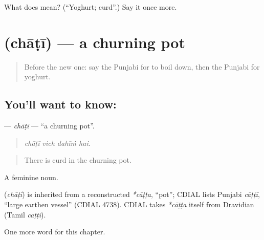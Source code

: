 \begin{tcolorbox}[breakable,colback=teal!4,colframe=teal!35!black,title={Before you move on}]
What does  mean? (\textquotedblleft{}Yoghurt; curd\textquotedblright{}.) Say it once more.
\end{tcolorbox}
\section[\texorpdfstring{\pa{ਚਾਟੀ} (chāṭī)}{ਚਾਟੀ (chāṭī)}]{ (chāṭī) — a churning pot}

\label{lesson:PA-C237-chati}



\begin{quote}
Before the new one: say the Punjabi for to boil down, then the Punjabi for yoghurt.
\end{quote}

\subsection*{You'll want to know: }
\textbf{} — \emph{chāṭī} — \textquotedblleft{}a churning pot\textquotedblright{}.

\begin{quote}
   
\end{quote}

\begin{quote}
\emph{chāṭī vich dahīṁ hai.}
\end{quote}

\begin{quote}
There is curd in the churning pot.
\end{quote}

A feminine noun.

\begin{cousinweb}
\textbf{} (\emph{chāṭī}) is inherited from a reconstructed \emph{*cāṭṭa}, \textquotedblleft{}pot\textquotedblright{}; CDIAL lists Punjabi \emph{cāṭṭī}, \textquotedblleft{}large earthen vessel\textquotedblright{} (CDIAL 4738). CDIAL takes \emph{*cāṭṭa} itself from Dravidian (Tamil \emph{caṭṭi}).
\end{cousinweb}

\begin{grammarlens}[title={What you've built}]
One more word for this chapter.
\end{grammarlens}

